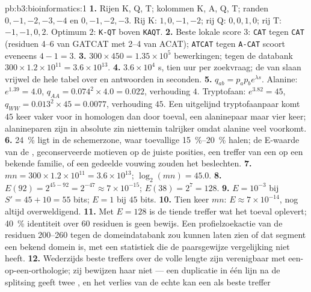 \begin{solution}{pb:b3:bioinformatics:1}
\textbf{1.} Rijen K, Q, T; kolommen K, A, Q, T; randen $0,-1,-2,-3,-4$
en $0,-1,-2,-3$. Rij K: $1, 0, -1, -2$; rij Q: $0, 0, 1, 0$; rij T:
$-1, -1, 0, 2$. Optimum $2$: \texttt{K-QT} boven \texttt{KAQT}.
\textbf{2.} Beste lokale score $3$: \texttt{CAT} tegen \texttt{CAT}
(residuen 4--6 van GATCAT met 2--4 van ACAT); \texttt{ATCAT} tegen
\texttt{A-CAT} scoort eveneens $4 - 1 = 3$.
\textbf{3.} $300\times 450 = 1.35\times 10^{5}$ bewerkingen; tegen de
databank $300\times 1.2\times 10^{11} = 3.6\times 10^{13}$.
\textbf{4.} $3.6\times 10^{4}$ s, tien uur per zoekvraag; de  van
 slaan vrijwel de hele tabel over en antwoorden in seconden.
\textbf{5.} $q_{ab} = p_{a}p_{b}e^{\lambda s}$. Alanine: $e^{1.39} = 4.0$,
$q_{AA} = 0.074^{2}\times 4.0 = 0.022$, verhouding $4$. Tryptofaan:
$e^{3.82} = 45$, $q_{WW} = 0.013^{2}\times 45 = 0.0077$, verhouding
$45$. Een uitgelijnd tryptofaanpaar komt $45$ keer vaker voor in
homologen dan door toeval, een alaninepaar maar vier keer;
alanineparen zijn in absolute zin niettemin talrijker omdat alanine
veel voorkomt.
\textbf{6.} \qty{24}{\%} ligt in de schemerzone, waar toevallige
 \qtyrange{15}{20}{\%} halen; de E-waarde van de ,
geconserveerde motieven op de juiste posities, een treffer van een
 op een bekende familie, of een gedeelde vouwing zouden het
beslechten.
\textbf{7.} $mn = 300\times 1.2\times 10^{11} = 3.6\times 10^{13}$;
$\log_{2}(mn) = 45.0$.
\textbf{8.} $E(92) = 2^{45 - 92} = 2^{-47} \approx 7\times 10^{-15}$;
$E(38) = 2^{7} = 128$.
\textbf{9.} $E = 10^{-3}$ bij $S' = 45 + 10 = 55$ bits; $E = 1$ bij $45$
bits.
\textbf{10.} Tien keer $mn$: $E \approx 7\times 10^{-14}$, nog altijd
overweldigend.
\textbf{11.} Met $E = 128$ is de tiende treffer wat het toeval
oplevert; \qty{40}{\%} identiteit over $60$ residuen is geen bewijs. Een
profielzoekactie van de residuen 200--260 tegen de domeindatabank zou
kunnen laten zien of dat segment een bekend domein is, met een
statistiek die de paarsgewijze vergelijking niet heeft.
\textbf{12.} Wederzijds beste treffers over de volle lengte zijn
verenigbaar met een-op-een-orthologie; zij bewijzen haar niet --- een
duplicatie in één lijn na de splitsing geeft twee , en het
verlies van de echte  kan een  als beste treffer

\end{solution}
